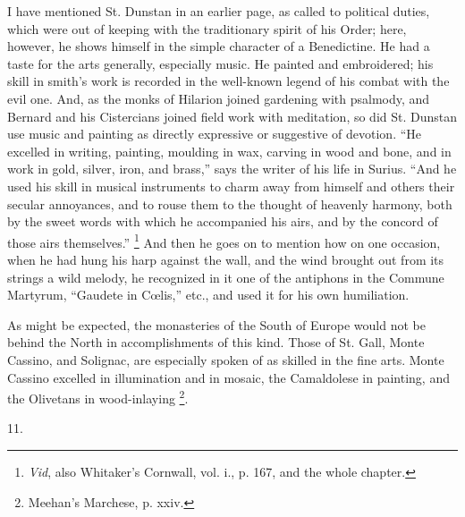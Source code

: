 I have mentioned St. Dunstan in an earlier page, as called to
political duties, which were out of keeping with the traditionary
spirit of his Order; here, however, he shows himself in the simple
character of a Benedictine. He had a taste for the arts generally,
especially music. He painted and embroidered; his skill in smith's
work is recorded in the well-known legend of his combat with the evil
one. And, as the monks of Hilarion joined gardening with psalmody, and
Bernard and his Cistercians joined field work with meditation, so did
St. Dunstan use music and painting as directly expressive or
suggestive of devotion. ``He excelled in writing, painting,
moulding in wax, carving in wood and bone, and in work in gold,
silver, iron, and brass,'' says the writer of his life in
Surius. ``And he used his skill in musical instruments to charm
away from himself and others their secular annoyances, and to rouse
them to the thought of heavenly harmony, both by the sweet words with
which he accompanied his airs, and by the concord of those airs
themselves.'' \footnote{\emph{Vid},
also Whitaker's Cornwall, vol. i., p. 167, and the whole chapter.} And
then he goes on to mention how on one occasion, when he had hung his
harp against the wall, and the wind brought out from its strings a
wild melody, he recognized in it one of the antiphons in the Commune
Martyrum, ``Gaudete in Cœlis,'' etc., and used it for his own
humiliation.

As might be expected, the monasteries of the South of Europe would
not be behind the North in accomplishments of this kind. Those of St.
Gall, Monte Cassino, and Solignac, are especially spoken of as skilled
in the fine arts. Monte Cassino excelled in illumination and in
mosaic, the Camaldolese in painting, and the Olivetans in
wood-inlaying \footnote{Meehan's
Marchese, p. xxiv.}.

11.


